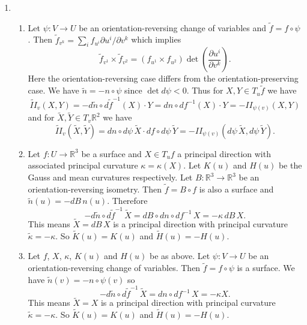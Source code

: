 \documentclass[a4paper, 12pt]{article}
\newcommand{\R}{\mathbb{R}}
\begin{document}
\begin{enumerate}

\item \begin{enumerate}

\item Let \(\psi\colon V\to U\) be an orientation-reversing change of variables and \(\tilde f=f\circ\psi\). Then \(\tilde f_{v^k}=\sum_if_{u^i}\partial u^i/\partial v^k\) which implies
\[\tilde f_{v^1}\times\tilde f_{v^2}=(f_{u^1}\times f_{u^2})\det\left(\frac{\partial u^i}{\partial v^k}\right).\]
Here the orientation-reversing case differs from the orientation-preserving case. We have \(\tilde n=-n\circ \psi\) since \(\det d\psi<0\). Thus for \(X,Y\in T_u\tilde f\) we have
\[\widetilde{II}_v(X,Y)=-d\tilde n\circ d\tilde f^{-1}(X)\cdot Y=dn\circ df^{-1}(X)\cdot Y=-II_{\psi(v)}(X,Y)\]
and for \(\tilde X,\tilde Y\in T_v\R^2\) we have
\[\widetilde{II}_v(\tilde X,\tilde Y)=dn\circ d\psi\,\tilde X\cdot df\circ d\psi\,\tilde Y=-II_{\psi(v)}(d\psi\,\tilde X,d\psi\,\tilde Y).\]

\item Let \(f\colon U\to\R^3\) be a surface and \(X\in T_uf\) a principal direction with associated principal curvature \(\kappa=\kappa(X)\). Let \(K(u)\) and \(H(u)\) be the Gauss and mean curvatures respectively. Let \(B\colon \R^3\to\R^3\) be an orientation-reversing isometry. Then \(\tilde f=B\circ f\) is also a surface and \(\tilde n(u)=-dB\,n(u)\). Therefore
\[-d\tilde n\circ d\tilde f^{-1}\,\tilde X=dB\circ dn\circ df^{-1}\,X=-\kappa\,dB\,X.\]
This means \(\tilde X=dB\,X\) is a principal direction with principal curvature \(\tilde\kappa=-\kappa\). So \(\tilde K(u)=K(u)\) and \(\tilde H(u)=-H(u)\).

\item Let \(f\), \(X\), \(\kappa\), \(K(u)\) and \(H(u)\) be as above. Let \(\psi\colon V\to U\) be an orientation-reversing change of variables. Then \(\tilde f=f\circ\psi\) is a surface. We have \(\tilde n(v)=-n\circ\psi(v)\) so
\[-d\tilde n\circ d\tilde f^{-1}\,\tilde X=dn\circ df^{-1}\,X=-\kappa X.\]
This means \(\tilde X=X\) is a principal direction with principal curvature \(\tilde\kappa=-\kappa\). So \(\tilde K(u)=K(u)\) and \(\tilde H(u)=-H(u)\).

\end{enumerate}


\end{enumerate}
\end{document}

